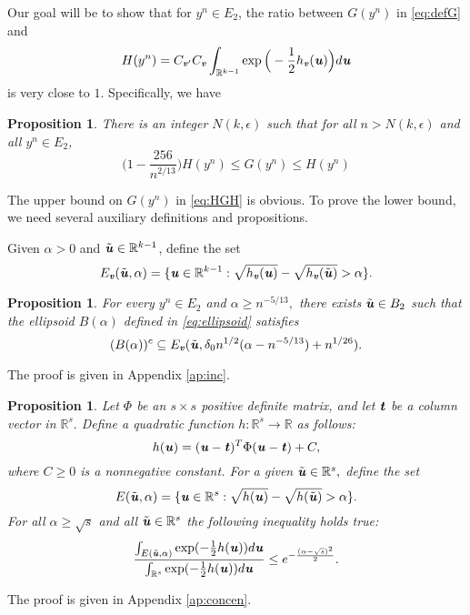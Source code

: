 \documentclass[11pt,onecolumn]{IEEEtran}
\newtheorem{proposition}[theorem]{Proposition}
\def\mathbi#1{{\textbf{\textit #1}}}
\begin{document}
\vspace{.1in}
Our goal will be to show that for $y^n\in E_2$, the ratio between $G(y^n)$ in \eqref{eq:defG} and 
\begin{equation}\label{eq:H}
H(y^n) = C_{\mathbi{v}'}  C_{\mathbi{v}}  \int_{\mathbb{R}^{k-1}} 
\exp\Big( - \frac{1}{2} h_{\mathbi{v}}(\mathbi{u}) \Big) d\mathbi{u} 
\end{equation}
is very close to $1.$ Specifically, we have 
\begin{proposition} \label{prop:HGH}
 There is an integer $N(k,\epsilon)$ such that for all $n>N(k,\epsilon)$ and all
$y^n \in  E_2$,
  \begin{equation}\label{eq:HGH}
  \Big(1-\frac{256}{n^{2/13}}\Big)H(y^n)\le G(y^n)\le H(y^n)
  \end{equation}
\end{proposition}

The upper bound on $G(y^n)$ in \eqref{eq:HGH} is obvious. To prove the lower bound, we need several auxiliary definitions and propositions.


Given $\alpha>0$ and $\tilde{\mathbi{u}} \in \mathbb{R}^{k-1}$, define the set
   \begin{equation}\label{eq:Ev}
E_{\mathbi{v}}(\tilde{\mathbi{u}}, \alpha)=\{\mathbi{u} \in \mathbb{R}^{k-1}: \sqrt{h_{\mathbi{v}}(\mathbi{u})} - \sqrt{h_{\mathbi{v}}(\tilde{\mathbi{u}})} > \alpha \}.
  \end{equation}
\begin{proposition}\label{Prop:inc}
For every $y^n \in E_2$ and $\alpha\ge n^{-5/13},$ there exists $\tilde{\mathbi{u}} \in B_2$ such that the ellipsoid $B(\alpha)$ defined in \eqref{eq:ellipsoid}
satisfies
\begin{equation}\label{eq:BEag}
(B(\alpha))^c \subseteq E_{\mathbi{v}}(\tilde{\mathbi{u}}, \delta_0 n^{1/2} (\alpha - n^{-5/13} ) + n^{1/26}).
\end{equation}
\end{proposition}
The proof is given in Appendix \ref{ap:inc}. 
\begin{proposition}\label{Prop:U}
Let $\Phi$ be an $s\times s$ positive definite matrix, and let $\mathbi{t}$ be a column vector in $\mathbb{R}^s.$
Define a quadratic function $h:\mathbb{R}^s \to \mathbb{R}$ as follows:
\begin{equation}\label{eq:form}
h(\mathbi{u})=  (\mathbi{u}-\mathbi{t})^T \Phi  (\mathbi{u}-\mathbi{t}) + C,
\end{equation}
where $C \ge 0$ is a nonnegative constant.
For a given $\tilde{\mathbi{u}}\in \mathbb{R}^s,$ define the set
$$
E(\tilde{\mathbi{u}}, \alpha)=\{\mathbi{u} \in \mathbb{R}^s: \sqrt{h(\mathbi{u})} - \sqrt{h(\tilde{\mathbi{u}})} > \alpha \}.
$$
For all  $\alpha \ge \sqrt{s}$ and all $\tilde{\mathbi{u}} \in \mathbb{R}^s$ the following inequality holds true:
  \begin{equation}\label{eq:II}
\frac{\int_{E(\tilde{\mathbi{u}}, \alpha)} \exp(-\frac{1}{2}h(\mathbi{u})) d\mathbi{u}}{\int_{\mathbb{R}^s} \exp(-\frac{1}{2} h(\mathbi{u})) d\mathbi{u}}
\le e^{-\frac{(\alpha-\sqrt{s})^2}{2}}.
  \end{equation}
\end{proposition}
The proof is given in Appendix \ref{ap:concen}.
\end{document}
